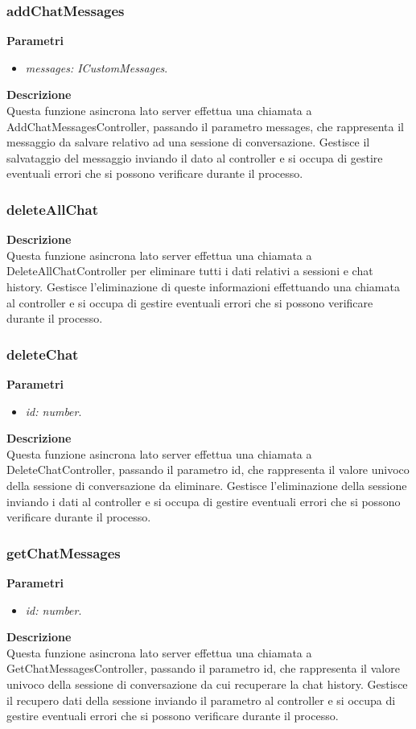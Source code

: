 \subsubsection{addChatMessages}
\textbf{Parametri}
\begin{itemize}
    \item \textit{messages: ICustomMessages}.
\end{itemize}
\textbf{Descrizione}\\
Questa funzione asincrona lato server effettua una chiamata a AddChatMessagesController, passando il parametro messages, che rappresenta il messaggio da salvare relativo ad una sessione di conversazione. Gestisce il salvataggio del messaggio inviando il dato al controller e si occupa di gestire eventuali errori che si possono verificare durante il processo.

\subsubsection{deleteAllChat}
\textbf{Descrizione}\\
Questa funzione asincrona lato server effettua una chiamata a DeleteAllChatController per eliminare tutti i dati relativi a sessioni e chat history. Gestisce l'eliminazione di queste informazioni effettuando una chiamata al controller e si occupa di gestire eventuali errori che si possono verificare durante il processo.

\subsubsection{deleteChat}
\textbf{Parametri}
\begin{itemize}
    \item \textit{id: number}.
\end{itemize}
\textbf{Descrizione}\\
Questa funzione asincrona lato server effettua una chiamata a DeleteChatController, passando il parametro id, che rappresenta il valore univoco della sessione di conversazione da eliminare. Gestisce l'eliminazione della sessione inviando i dati al controller e si occupa di gestire eventuali errori che si possono verificare durante il processo.

\subsubsection{getChatMessages}
\textbf{Parametri}
\begin{itemize}
    \item \textit{id: number}.
\end{itemize}
\textbf{Descrizione}\\
Questa funzione asincrona lato server effettua una chiamata a GetChatMessagesController, passando il parametro id, che rappresenta il valore univoco della sessione di conversazione da cui recuperare la chat history. Gestisce il recupero dati della sessione inviando il parametro al controller e si occupa di gestire eventuali errori che si possono verificare durante il processo.

